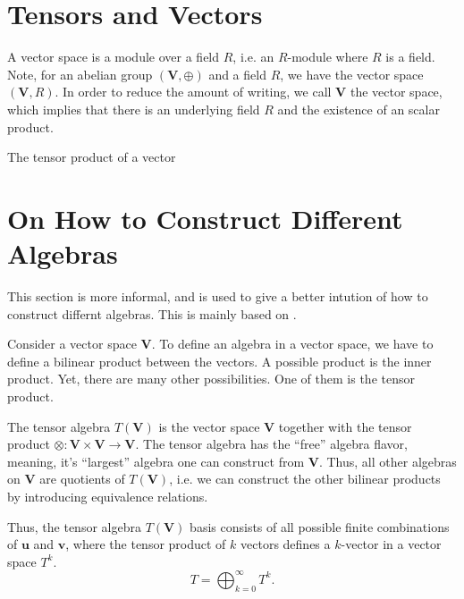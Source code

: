 \section{Tensors and Vectors}

\begin{definition}
	A vector space is a module over a field $R$, i.e. an $R$-module
	where $R$ is a field.
	Note, for an abelian group $(\mathbf V, \oplus)$
	and a field $R$, we have the vector space $(\mathbf V, R)$.
	In order to reduce the amount of writing, we call $\mathbf V$ the
	vector space, which implies that there is an underlying field $R$
	and the existence of an scalar product.
\end{definition}

The tensor product of a vector

\section{On How to Construct Different Algebras}

This section is more informal, and is used to give
a better intution of how to construct differnt algebras.
This is mainly based on \citet{vaz2016introduction}.

Consider a vector space $\mathbf V$.
To define an algebra in a vector space, we have to define a bilinear product
between the vectors. A possible product is the inner product. Yet,
there are many other possibilities. One of them is the tensor
product.

The tensor algebra $T(\mathbf V)$ is the vector space $\mathbf V$
together with the tensor product
$\otimes:\mathbf V \times \mathbf V \to \mathbf V$.
The tensor algebra has the ``free'' algebra flavor,
meaning, it's ``largest'' algebra one can construct from $\mathbf V$.
Thus, all other algebras on $\mathbf V$ are quotients of $T(\mathbf V)$,
i.e. we can construct the other bilinear products by introducing equivalence
relations.

Thus, the tensor algebra $T(\mathbf V)$ basis consists of all possible
finite combinations of $\mathbf u$ and $\mathbf v$,
where the tensor product of $k$ vectors defines a $k$-vector
in a vector space $T^k$.
\begin{displaymath}
	T = \bigoplus^{\infty}_{k=0} T^k.
\end{displaymath}

